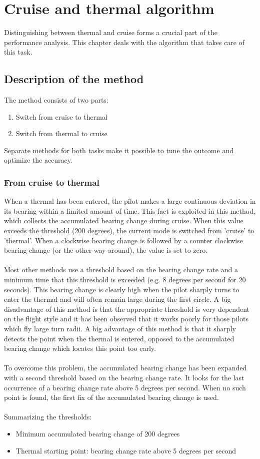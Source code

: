 \chapter{Cruise and thermal algorithm}
Distinguishing between thermal and cruise forms a crucial part of the performance analysis. This chapter deals with the algorithm that takes care of this task.

\section{Description of the method} \label{descr_turn_cruise}
The method consists of two parts:
\begin{enumerate}
\item Switch from cruise to thermal
\item Switch from thermal to cruise
\end{enumerate}
Separate methods for both tasks make it possible to tune the outcome and optimize the accuracy.

\subsection{From cruise to thermal}
When a thermal has been entered, the pilot makes a large continuous deviation in its bearing within a limited amount of time. This fact is exploited in this method, which collects the accumulated bearing change during cruise. When this value exceeds the threshold (200 degrees), the current mode is switched from 'cruise' to 'thermal'. When a clockwise bearing change is followed by a counter clockwise bearing change (or the other way around), the value is set to zero.\\
\ \\
Most other methods use a threshold based on the bearing change rate and a minimum time that this threshold is exceeded (e.g. 8 degrees per second for 20 seconds). This bearing change is clearly high when the pilot sharply turns to enter the thermal and will often remain large during the first circle. A big disadvantage of this method is that the appropriate threshold is very dependent on the flight style and it has been observed that it works poorly for those pilots which fly large turn radii. A big advantage of this method is that it sharply detects the point when the thermal is entered, opposed to the accumulated bearing change which locates this point too early.\\
\ \\
To overcome this problem, the accumulated bearing change has been expanded with a second threshold based on the bearing change rate. It looks for the last occurrence of a bearing change rate above 5 degrees per second. When no such point is found, the first fix of the accumulated bearing change is used.\\
\ \\
Summarizing the thresholds:
\begin{itemize}
\item Minimum accumulated bearing change of 200 degrees
\item Thermal starting point: bearing change rate above 5 degrees per second
\end{itemize}

